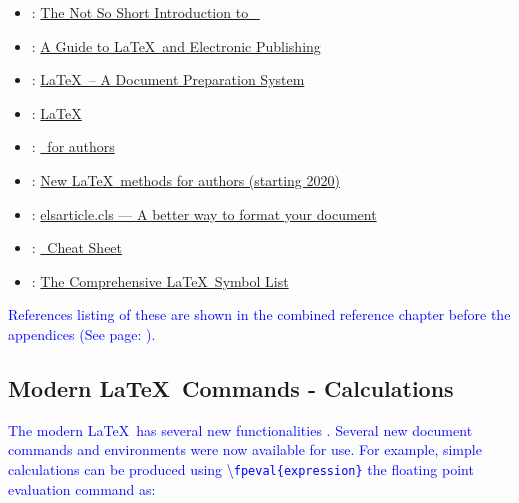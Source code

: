 \documentclass[phd,showgrids]{ndsu-thesis-2022}
\newcommand\italk[1]{\textcolor{blue}{#1}}  %
\newcommand\cmd[1]{\textbackslash\texttt{#1}}  %
\begin{document}
\begin{itemize}
\setlength\itemindent{0.25in}
\item \citet{notso2021}:  \textcolor{magenta}{\href{http://tug.ctan.org/info/lshort/english/lshort.pdf}
{The Not So Short Introduction to \LaTeXe\ }}

\item \citet{kopka2004guide}:  \textcolor{magenta}{\href{https://www.math.ucdavis.edu/~tracy/courses/math129/Guide_To_LaTeX.pdf}
{A Guide to \LaTeX\ and Electronic Publishing}}

\item \citet{lamport94}: \textcolor{magenta}{\href{https://www.pearson.com/us/higher-education/program/Lamport-La-Te-X-A-Document-Preparation-System-2nd-Edition/PGM159713.html}
{\LaTeX\ -- A Document Preparation System}}

\item \citet{Wikibook2016}: \textcolor{magenta}{\href{http://upload.wikimedia.org/wikipedia/commons/2/2d/LaTeX.pdf}
{LaTeX}}

\item \citet{latxprojteam20}: \textcolor{magenta}{\href{https://www.latex-project.org/help/documentation/usrguide.pdf}
{\LaTeXe\ for authors}}

\item \citet{latxprojteam22}: \textcolor{magenta}{\href{https://www.latex-project.org/help/documentation/usrguide3.pdf}
{New \LaTeX\ methods for authors (starting 2020)}}

\item \citet{elsevier2020}: \textcolor{magenta}{\href{https://www.elsevier.com/authors/policies-and-guidelines/documents/elsdoc-1.pdf}
{elsarticle.cls --- A better way to format your document}}

\item \citet{Chang2014cheat}: \textcolor{magenta}{\href{https://wch.github.io/latexsheet/latexsheet.pdf}
{\LaTeXe\ Cheat Sheet}}

\item \citet{pakin2021comp}: \textcolor{magenta}{\href{https://tug.ctan.org/info/symbols/comprehensive/symbols-a4.pdf}
{The Comprehensive \LaTeX\ Symbol List}}
\end{itemize}

\italk{References listing of these are shown in the combined reference chapter before the appendices (See page: \pageref{biblio}).}

\subsection{Modern \LaTeX\ Commands - Calculations}
\italk{The modern \LaTeX\ has several new functionalities \citep{latxprojteam22}. Several new document commands and environments were now available for use.  For example, simple calculations can be produced using \cmd{fpeval\{expression\}} the floating point evaluation command as:}
\end{document}
